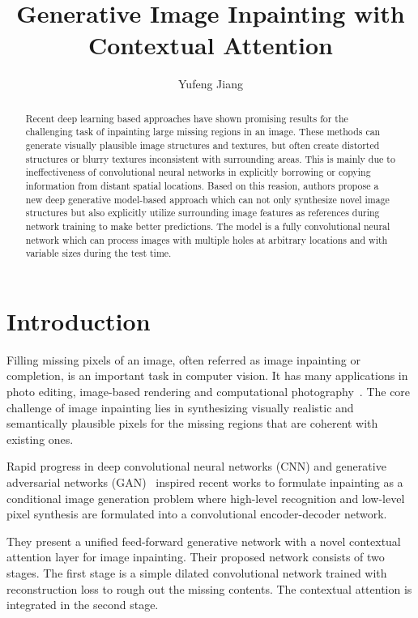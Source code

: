 \documentclass[10pt,twocolumn,letterpaper]{article}
\begin{document}
\title{Generative Image Inpainting with Contextual Attention}
\author{Yufeng Jiang}
\maketitle

\begin{abstract}

Recent deep learning based approaches have shown promising results for the challenging task of inpainting large missing regions in an image. These methods can generate visually plausible image structures and textures, but often create distorted structures or blurry textures inconsistent with surrounding areas. This is mainly due to ineffectiveness of convolutional neural networks in explicitly borrowing or copying information from distant spatial locations. Based on this reasion, authors propose a new deep generative model-based approach which can not only synthesize novel image structures but also explicitly utilize surrounding image features as references during network training to make better predictions. The model is a fully convolutional neural network which can process images with multiple holes at arbitrary locations and with variable sizes during the test time.

\end{abstract}

\section{Introduction}

Filling missing pixels of an image, often referred as image inpainting or completion, is an important task in computer vision. It has many applications in photo editing, image-based rendering and computational photography~\cite{25}. The core challenge of image inpainting lies in synthesizing visually realistic and semantically plausible pixels for the missing regions that are coherent with existing ones.

Rapid progress in deep convolutional neural networks (CNN) and generative adversarial networks (GAN)~\cite{12} inspired recent works to formulate inpainting as a conditional image generation problem where high-level recognition and low-level pixel synthesis are formulated into a convolutional encoder-decoder network.

They present a unified feed-forward generative network with a novel contextual attention layer for image inpainting. Their proposed network consists of two stages. The first stage is a simple dilated convolutional network trained with reconstruction loss to rough out the missing contents. The contextual attention is integrated in the second stage.
\end{document}
